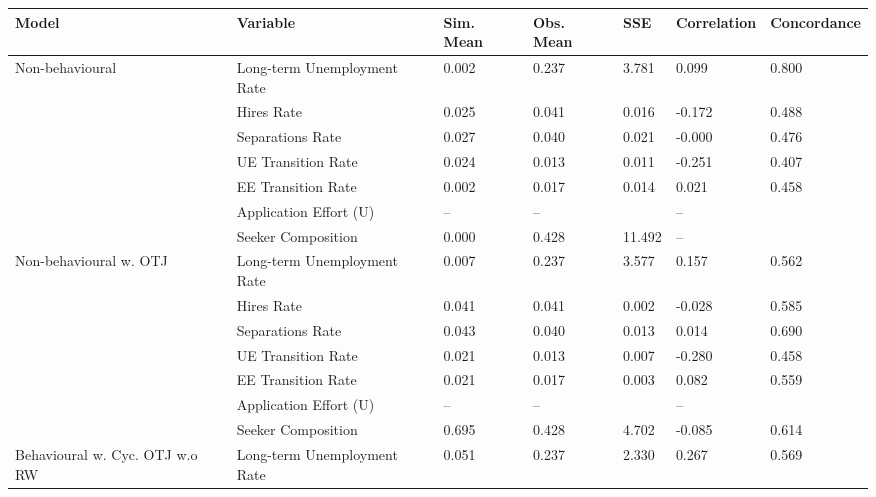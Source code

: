 \begin{adjustbox}{width=\textwidth}
\begin{tabular}{lllllll}
\toprule
Model & Variable & Sim. Mean & Obs. Mean & SSE & Correlation & Concordance \\
\midrule
\cellcolor{modelNonbehavioural!25}Non-behavioural & Long-term Unemployment Rate & 0.002 & 0.237 & 3.781 & \cellcolor{red!25}0.099 & 0.800 \\
\cellcolor{modelNonbehavioural!25} & Hires Rate & 0.025 & 0.041 & 0.016 & \cellcolor{red!25}-0.172 & 0.488 \\
\cellcolor{modelNonbehavioural!25} & Separations Rate & 0.027 & 0.040 & 0.021 & \cellcolor{yellow!25}-0.000 & 0.476 \\
\cellcolor{modelNonbehavioural!25} & UE Transition Rate & 0.024 & 0.013 & 0.011 & \cellcolor{green!70!yellow!25}-0.251 & 0.407 \\
\cellcolor{modelNonbehavioural!25} & EE Transition Rate & 0.002 & 0.017 & 0.014 & \cellcolor{orange!25}0.021 & 0.458 \\
\cellcolor{modelNonbehavioural!25} & Application Effort (U) & -- & -- &  & -- &  \\
\cellcolor{modelNonbehavioural!25} & Seeker Composition & 0.000 & 0.428 & 11.492 & -- &  \\
\cellcolor{modelNonbehaviouralwOTJ!25}Non-behavioural w. OTJ & Long-term Unemployment Rate & 0.007 & 0.237 & 3.577 & \cellcolor{orange!25}0.157 & 0.562 \\
\cellcolor{modelNonbehaviouralwOTJ!25} & Hires Rate & 0.041 & 0.041 & 0.002 & \cellcolor{green!70!yellow!25}-0.028 & 0.585 \\
\cellcolor{modelNonbehaviouralwOTJ!25} & Separations Rate & 0.043 & 0.040 & 0.013 & \cellcolor{green!40!yellow!25}0.014 & 0.690 \\
\cellcolor{modelNonbehaviouralwOTJ!25} & UE Transition Rate & 0.021 & 0.013 & 0.007 & \cellcolor{orange!25}-0.280 & 0.458 \\
\cellcolor{modelNonbehaviouralwOTJ!25} & EE Transition Rate & 0.021 & 0.017 & 0.003 & \cellcolor{green!70!yellow!25}0.082 & 0.559 \\
\cellcolor{modelNonbehaviouralwOTJ!25} & Application Effort (U) & -- & -- &  & -- &  \\
\cellcolor{modelNonbehaviouralwOTJ!25} & Seeker Composition & 0.695 & 0.428 & 4.702 & \cellcolor{orange!25}-0.085 & 0.614 \\
\cellcolor{modelBehaviouralwCycOTJwoRW!25}Behavioural w. Cyc. OTJ w.o RW & Long-term Unemployment Rate & 0.051 & 0.237 & 2.330 & \cellcolor{green!70!yellow!25}0.267 & 0.569 \\

\end{tabular}
\end{adjustbox}
